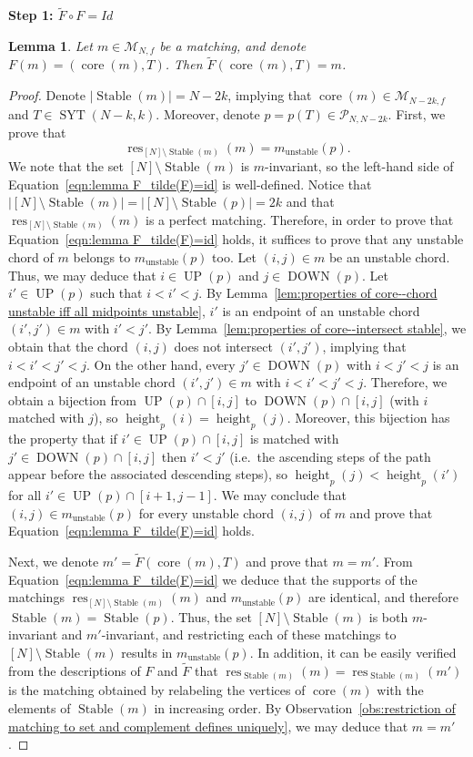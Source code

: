 \documentclass[11pt]{article}
\makeatletter
\newtheorem{lemma}[theo]{Lemma}
\theoremstyle{definition}
\providecommand{\ie}{i.e.\ }
\numberwithin{equation}{section}
\newcommand{\Syt}{\operatorname{SYT}}
\newcommand{\Stable}{\operatorname{Stable}}
\newcommand{\height}{\operatorname{height}}
\newcommand{\core}{\operatorname{core}}
\newcommand{\res}{\operatorname{res}}
\newcommand{\UP}{\operatorname{UP}}
\newcommand{\DOWN}{\operatorname{DOWN}}
\newcommand{\M}{\mathcal{M}}
\newcommand{\Pcal}{\mathcal{P}}
\newcommand{\proofstep}[1]{
  \par
  \addvspace{\medskipamount}
  \textbf{#1\@addpunct{.}}\enspace\ignorespaces
}
\makeatother
\begin{document}
\proofstep{Step 1: $\tilde{F}\circ F = Id$}
\begin{lemma}
\label{lem:F_tilde(F)=id}
    Let $m \in \M_{N,f}$ be a matching, and denote $F(m) = (\core(m),T)$. Then $\tilde{F}(\core(m),T) = m$.
\end{lemma}
\begin{proof}
    Denote $\left|\Stable(m)\right| = N-2k$, implying that $\core(m) \in \M_{N-2k,f}$ and $T \in \Syt(N-k,k)$. Moreover, denote $p=p(T) \in \Pcal_{N,N-2k}$. First, we prove that
    \begin{equation}
    \label{eqn:lemma F_tilde(F)=id}
        \res_{[N]\setminus\Stable(m)}(m) = m_{\text{unstable}}(p).
    \end{equation}
    We note that the set $[N] \setminus \Stable(m)$ is $m$-invariant, so the left-hand side of Equation~\eqref{eqn:lemma F_tilde(F)=id} is well-defined. Notice that $|[N]\setminus\Stable(m)| = |[N]\setminus\Stable(p)| = 2k$ and that $\res_{[N]\setminus\Stable(m)}(m)$ is a perfect matching. Therefore, in order to prove that Equation~\eqref{eqn:lemma F_tilde(F)=id} holds, it suffices to prove that any unstable chord of $m$ belongs to $m_{\text{unstable}}(p)$ too. Let $(i,j) \in m$ be an unstable chord. Thus, we may deduce that $i \in \UP(p)$ and $j \in \DOWN(p)$. Let $i' \in \UP(p)$ such that $i < i' < j$. By Lemma~\ref{lem:properties of core--chord unstable iff all midpoints unstable}, $i'$ is an endpoint of an unstable chord $(i',j') \in m$ with $i' < j'$. By Lemma~\ref{lem:properties of core--intersect stable}, we obtain that the chord $(i,j)$ does not intersect $(i',j')$, implying that $i < i' < j' < j$. On the other hand, every $j' \in \DOWN(p)$ with $i < j' < j$ is an endpoint of an unstable chord $(i',j') \in m$ with $i < i' < j' < j$. Therefore, we obtain a bijection from $\UP(p) \cap [i,j]$ to $\DOWN(p) \cap [i,j]$ (with $i$ matched with $j$), so $\height_p(i) = \height_p(j)$. Moreover, this bijection has the property that if $i' \in \UP(p) \cap [i,j]$ is matched with $j' \in \DOWN(p) \cap [i,j]$ then $i' < j'$ (\ie the ascending steps of the path appear before the associated descending steps), so $\height_p(j) < \height_p(i')$ for all $i' \in \UP(p) \cap [i+1,j-1]$. We may conclude that $(i,j) \in m_{\text{unstable}}(p)$ for every unstable chord $(i,j)$ of $m$ and prove that Equation~\eqref{eqn:lemma F_tilde(F)=id} holds.

    Next, we denote $m' = \tilde{F}(\core(m),T)$ and prove that $m=m'$. From Equation~\eqref{eqn:lemma F_tilde(F)=id} we deduce that the supports of the matchings $\res_{[N]\setminus\Stable(m)}(m)$ and $m_{\text{unstable}}(p)$ are identical, and therefore $\Stable(m) = \Stable(p)$. Thus, the set $[N]\setminus\Stable(m)$ is both $m$-invariant and $m'$-invariant, and restricting each of these matchings to $[N]\setminus\Stable(m)$ results in $m_{\text{unstable}}(p)$. In addition, it can be easily verified from the descriptions of $F$ and $\tilde{F}$ that $\res_{\Stable(m)}(m) = \res_{\Stable(m)}(m')$ is the matching obtained by relabeling the vertices of $\core(m)$ with the elements of $\Stable(m)$ in increasing order. By Observation~\ref{obs:restriction of matching to set and complement defines uniquely}, we may deduce that $m=m'$.
\end{proof}
\end{document}

